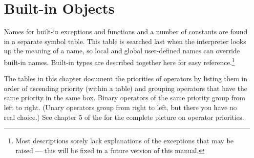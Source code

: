 \chapter{Built-in Objects \label{builtin}}

Names for built-in exceptions and functions and a number of constants are
found in a separate 
symbol table.  This table is searched last when the interpreter looks
up the meaning of a name, so local and global
user-defined names can override built-in names.  Built-in types are
described together here for easy reference.\footnote{
	Most descriptions sorely lack explanations of the exceptions
	that may be raised --- this will be fixed in a future version of
	this manual.}

The tables in this chapter document the priorities of operators by
listing them in order of ascending priority (within a table) and
grouping operators that have the same priority in the same box.
Binary operators of the same priority group from left to right.
(Unary operators group from right to left, but there you have no real
choice.)  See chapter 5 of the  for the complete picture on operator priorities.
